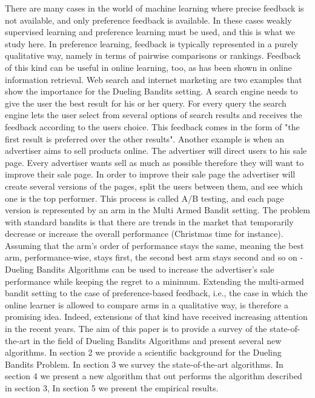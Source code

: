 \documentclass{llncs}
\begin{document}
	There are many cases in the world of machine learning where precise feedback is not available, and only preference feedback is available. In these cases weakly supervised learning and preference learning must be used, and this is what we study here.  		 
	In preference learning, feedback is typically represented in a purely qualitative way, namely in terms of pairwise comparisons or rankings. 
	Feedback of this kind can be useful in online learning, too, as has been shown in online information retrieval.
	Web search and internet marketing are two examples that show the importance for the Dueling Bandits setting. A search engine needs to give the user the best result for his or her query. For every query the search engine lets the user select from several options of search results and receives the feedback according to the users choice. This feedback comes in the form of "the first result is preferred over the other results".  
	Another example is when an advertiser aims to sell products online. The advertiser will direct users to his sale page. 
	Every advertiser wants sell as much as possible therefore they will want to improve their sale page. In order to improve their sale page the advertiser will create several versions of the pages, split the users between them, and see which one is the top performer. This process is called A/B testing, and each page version is represented by an arm in the Multi Armed Bandit  setting. 
	The problem with standard bandits is that there are trends in the market that temporarily decrease or increase the overall performance (Christmas time for instance). 
	Assuming that the arm's order of performance stays the same, meaning the best arm, performance-wise, stays first, the second best arm stays second and so on - Dueling Bandits Algorithms can be used to increase the advertiser's sale performance while keeping the regret to a minimum.	
	Extending the multi-armed bandit setting to the case of preference-based feedback, i.e., the case in which the online learner is allowed to compare arms in a qualitative way, is therefore a promising idea. 
	Indeed, extensions of that kind have received increasing attention in the recent years. 
	The aim of this paper is to provide a survey of the state-of-the-art in the field of Dueling Bandits Algorithms and present several new algorithms. 
	In section 2 we provide a scientific background for the Dueling Bandits Problem. In section 3 we survey the state-of-the-art algorithms. In section 4 we present a new algorithm that out performs the algorithm described in section 3, In section 5 we present the empirical results.
\newpage
\end{document}
